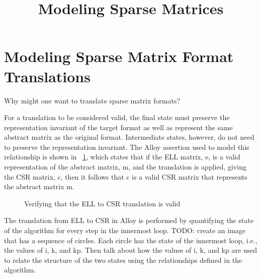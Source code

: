 \documentclass[11pt,conference]{IEEEtran}
\title{Modeling Sparse Matrices}
\begin{document}
\maketitle

\section{Modeling Sparse Matrix Format Translations}

Why might one want to translate sparse matrix formats?

For a translation to be considered valid, the final state must preserve the representation invariant of the target format as well as represent the same abstract matrix as the original format.  Intermediate states, however, do not need to preserve the representation invariant.  The Alloy assertion used to model this relationship is shown in \figurename~\ref{alloy:csrellvalid}, which states that if the ELL matrix, e, is a valid representation of the abstract matrix, m, and the translation is applied, giving the CSR matrix, c, then it follows that c is a valid CSR matrix that represents the abstract matrix m.

\begin{figure}

\caption{Verifying that the ELL to CSR translation is valid}
\label{alloy:csrellvalid}
\end{figure}

The translation from ELL to CSR in Alloy is performed by quantifying the state of the algorithm for every step in the innermost loop.  TODO: create an image that has a sequence of circles. Each circle has the state of the innermost loop, i.e., the values of i, k, and kp.  Then talk about how the values of i, k, and kp are used to relate the structure of the two states using the relationships defined in the algorithm.

\end{document}
